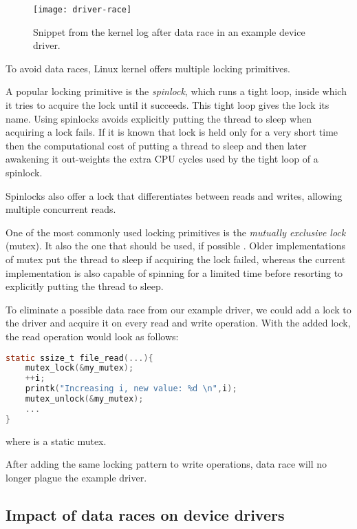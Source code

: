 \documentclass[..thesis.tex]{subfiles}
\begin{document}
\begin{figure}[H]
\centering
\texttt{[image: driver-race]}
\caption{Snippet from the kernel log after data race in an example device driver.}
\label{fig:driver-race}
\end{figure}



To avoid data races, Linux kernel offers multiple locking primitives. 

A popular locking primitive is the \textit{spinlock}, which runs a tight loop, inside which it tries to acquire the lock until it succeeds.
This tight loop gives the lock its name. Using spinlocks avoids explicitly putting the thread to sleep when acquiring a lock fails.
If it is known that lock is held only for a very short time then the computational cost of putting a thread to sleep and then later awakening
it out-weights the extra CPU cycles used by the tight loop of a spinlock.

Spinlocks also offer a lock that differentiates between reads and writes, allowing multiple concurrent reads.

One of the most commonly used locking primitives is the \textit{mutually exclusive lock} (mutex). It also the one that should be used, if possible
\cite[locking/mutex-design.txt]{torvalds_linux}. Older implementations of mutex put the thread to sleep if acquiring the lock failed,
whereas the current implementation is also capable of spinning for a limited time before resorting to explicitly putting the thread to sleep.

To eliminate a possible data race from our example driver, we could add a lock to the driver and acquire it on every read and write operation.
With the added lock, the read operation would look as follows:

\begin{lstlisting}[language=C,style=def]
static ssize_t file_read(...){
    mutex_lock(&my_mutex);
    ++i;
    printk("Increasing i, new value: %d \n",i);
    mutex_unlock(&my_mutex);
    ...
}
\end{lstlisting}

where  is a static mutex.

After adding the same locking pattern to write operations, data race will no longer plague the example driver.

\subsection{Impact of data races on device drivers}
\end{document}

